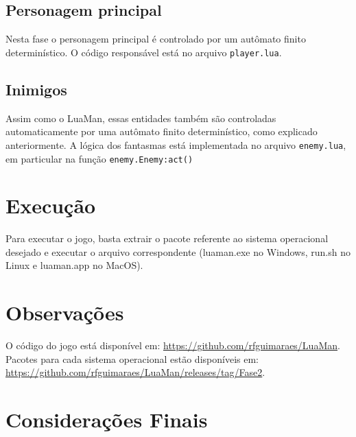\documentclass[a4paper]{scrartcl}
\begin{document}
\subsection{Personagem principal}

Nesta fase o personagem principal é controlado por um autômato finito determinístico.
O código responsável está no arquivo \texttt{player.lua}.

\subsection{Inimigos}

Assim como o LuaMan, essas entidades também são controladas automaticamente por uma autômato finito determinístico,
como explicado anteriormente. A lógica dos fantasmas está implementada no arquivo \texttt{enemy.lua}, em particular na função
\texttt{enemy.Enemy:act()}

\section{Execução}

Para executar o jogo, basta extrair o pacote referente ao sistema operacional desejado e executar o
arquivo correspondente (luaman.exe no Windows, run.sh no Linux e luaman.app no MacOS).

\section{Observações}

O código do jogo está disponível em: \url{https://github.com/rfguimaraes/LuaMan}.
Pacotes para cada sistema operacional estão disponíveis em: \url{https://github.com/rfguimaraes/LuaMan/releases/tag/Fase2}.

\section{Considerações Finais}

%
\end{document}

